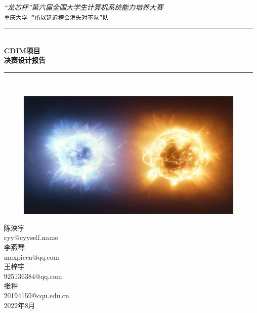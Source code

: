\documentclass[black,normal,cn,hide]{elegantbook}
\newcommand{\artdate}{2022年8月}
\newcommand{\cpuname}{CDIM}
\newcommand{\hlrule}{\rule{\linewidth}{0.5mm}}
\begin{document}
\begin{titlepage}
    \vfill
    \center 
    \textit{\Large “龙芯杯”第六届全国大学生计算机系统能力培养大赛}\\[0.5cm] 
    \texttt{\Large 重庆大学 “所以延迟槽会消失对不队”队}
  
    \vspace{1.5 cm}
    \hlrule \\[0.4 cm]
    { \huge \bfseries \cpuname 项目}\\[0.4cm]
    { \huge \bfseries 决赛设计报告}\\
    \hlrule \\[1cm]
   
    \begin{figure}[h]
      \centering
      \includegraphics[width=0.5\linewidth]{logo.png}
    \end{figure}
   \vspace{0.5 cm}
  
    \vspace{.5 cm}
    陈泱宇\\
    cyy@cyyself.name\\
    \vspace{.5 cm}
    李燕琴\\
    maxpicca@qq.com\\
    \vspace{.5 cm}
    王梓宇\\
    925136384@qq.com\\
    \vspace{.5 cm}
    张翀\\
    20194159@cqu.edu.cn\\
  
    \vspace{2 cm}
    {\large \artdate}\\[3cm] 
  
  \vfill
  
\end{titlepage}

\tableofcontents
\mainmatter



\end{document}
